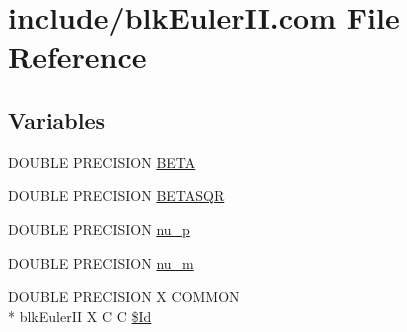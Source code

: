 \hypertarget{home_2abonfi_2_c_f_d__codes_2_eul_f_s_83_84_2include_2blk_euler_i_i_8com}{\section{include/blk\-Euler\-I\-I.com File Reference}
\label{home_2abonfi_2_c_f_d__codes_2_eul_f_s_83_84_2include_2blk_euler_i_i_8com}
}
\subsection*{Variables}
\begin{DoxyCompactItemize}
\item 
D\-O\-U\-B\-L\-E P\-R\-E\-C\-I\-S\-I\-O\-N \hyperlink{home_2abonfi_2_c_f_d__codes_2_eul_f_s_83_84_2include_2blk_euler_i_i_8com_a41ef0ad0ee32dac89987c7180349fc65}{B\-E\-T\-A}
\item 
D\-O\-U\-B\-L\-E P\-R\-E\-C\-I\-S\-I\-O\-N \hyperlink{home_2abonfi_2_c_f_d__codes_2_eul_f_s_83_84_2include_2blk_euler_i_i_8com_ac0146ab866702996a794cadecf77eb99}{B\-E\-T\-A\-S\-Q\-R}
\item 
D\-O\-U\-B\-L\-E P\-R\-E\-C\-I\-S\-I\-O\-N \hyperlink{home_2abonfi_2_c_f_d__codes_2_eul_f_s_83_84_2include_2blk_euler_i_i_8com_ab283911b22384fef633cd41d154f3f2f}{nu\-\_\-p}
\item 
D\-O\-U\-B\-L\-E P\-R\-E\-C\-I\-S\-I\-O\-N \hyperlink{home_2abonfi_2_c_f_d__codes_2_eul_f_s_83_84_2include_2blk_euler_i_i_8com_a98e43f19d876d2049e78b89adbf5a71d}{nu\-\_\-m}
\item 
D\-O\-U\-B\-L\-E P\-R\-E\-C\-I\-S\-I\-O\-N X C\-O\-M\-M\-O\-N \\*
blk\-Euler\-I\-I X C C \hyperlink{home_2abonfi_2_c_f_d__codes_2_eul_f_s_83_84_2include_2blk_euler_i_i_8com_aee39e63378026ca0f2ad3d2269ba8617}{\$\-Id}
\end{DoxyCompactItemize}


